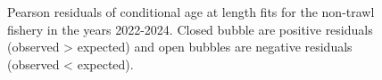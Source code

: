 \documentclass[
]{scrartcl}
\begin{document}
\begin{figure}[H]


\caption{\label{fig-peasrson-resids-age-nt2}Pearson residuals of
conditional age at length fits for the non-trawl fishery in the years
2022-2024. Closed bubble are positive residuals (observed \textgreater{}
expected) and open bubbles are negative residuals (observed \textless{}
expected).}

\end{figure}%
\end{document}
